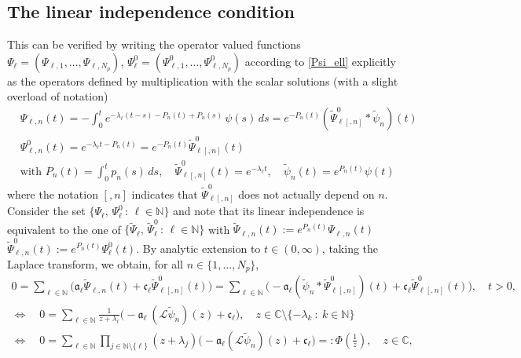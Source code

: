 \documentclass[12pt]{article}
\newcommand\contr{p}
\newcommand\Contr{P}
\newcommand\Ncont{N_p}
\begin{document}
\subsection{The linear independence condition} 
\label{subsec:linindep_diffusion}
This can be verified by writing the  operator valued functions $\Psi_\ell=(\Psi_{\ell,1},\ldots,\Psi_{\ell,\Ncont})$, $\Psi_\ell^0=(\Psi_{\ell,1}^0,\ldots,\Psi_{\ell,\Ncont}^0)$ according to \eqref{Psi_ell} explicitly as the operators defined by multiplication with the scalar solutions  (with a slight overload of notation)
\begin{equation}\label{PsiPsi0_diffusioneq}
\begin{aligned}
&\Psi_{\ell,n}(t)=-\int_0^t e^{-\lambda_\ell(t-s)-\Contr_n(t)+\Contr_n(s)}\,\psi(s)\, ds
=e^{-\Contr_n(t)}(\tilde{\Psi}_{\ell[,n]}^0*\tilde{\psi}_n)(t)\\
&\Psi_{\ell,n}^0(t)=e^{-\lambda_\ell t-\Contr_n(t)}
=e^{-\Contr_n(t)}\tilde{\Psi}_{\ell[,n]}^0(t)\\
&\text{with }\Contr_n(t)=\int_0^t\contr_n(s)\, ds, \quad
\tilde{\Psi}_{\ell[,n]}^0(t)=e^{-\lambda_\ell t}, \quad
\tilde{\psi}_n(t)=e^{\Contr_n(t)}\psi(t)
\end{aligned}
\end{equation}
where the notation $[,n]$ indicates that $\tilde{\Psi}_{\ell[,n]}^0$ does not actually depend on $n$.
\\
Consider the set $\{\Psi_\ell,\,\Psi_\ell^0\,:\,\ell\in\mathbb{N}\}$ and note that its linear independence is equivalent to the one of $\{\tilde{\Psi}_\ell,\,\tilde{\Psi}_\ell^0\,:\,\ell\in\mathbb{N}\}$ with 
$\tilde{\Psi}_{\ell,n}(t):=e^{\Contr_n(t)}\Psi_{\ell,n}(t)$
$\tilde{\Psi}_{\ell,n}^0(t):=e^{\Contr_n(t)}\Psi_\ell^0(t)$.
By analytic extension to $t\in(0,\infty)$, taking the Laplace transform, we obtain, for all $n\in\{1,\ldots,\Ncont\}$,  
\begin{equation}\label{Laplace_equivalences}
\begin{aligned}
0=\sum_{\ell\in\mathbb{N}} \bigl(\mathfrak{a}_\ell \tilde{\Psi}_{\ell,n}(t)+\mathfrak{c}_\ell \tilde{\Psi}_{\ell[,n]}^0(t)\bigr)
=\sum_{\ell\in\mathbb{N}} \bigl(-\mathfrak{a}_\ell (\tilde{\psi}_n*\tilde{\Psi}_{\ell[,n]}^0)(t)+\mathfrak{c}_\ell \tilde{\Psi}_{\ell[,n]}^0(t)\bigr), \quad t>0, \\
\Leftrightarrow \quad 
0=\sum_{\ell\in\mathbb{N}} \frac{1}{z+\lambda_\ell}\bigl(-\mathfrak{a}_\ell \ (\mathcal{L}\tilde{\psi}_n)(z)+\mathfrak{c}_\ell \bigr), \quad z\in\mathbb{C}\setminus\{-\lambda_k\ : \ k\in\mathbb{N}\}\\
\Leftrightarrow \quad 
0=\sum_{\ell\in\mathbb{N}} \prod_{j\in\mathbb{N}\setminus\{\ell\}}(z+\lambda_j)\bigl(-\mathfrak{a}_\ell (\mathcal{L}\tilde{\psi}_n)(z)+\mathfrak{c}_\ell \bigr)=:\Phi(\tfrac{1}{z}), \quad z\in\mathbb{C}, 
\end{aligned}
\end{equation}
\end{document}
